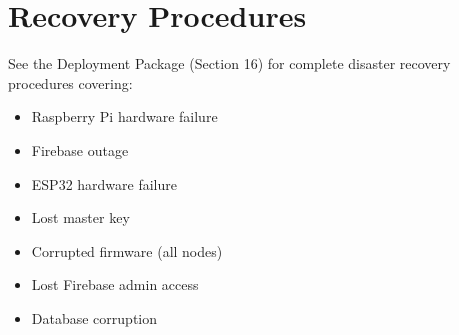 \section{Recovery Procedures}

See the Deployment Package (Section 16) for complete disaster recovery procedures covering:
\begin{itemize}[leftmargin=1.5em,noitemsep]
    \item Raspberry Pi hardware failure
    \item Firebase outage
    \item ESP32 hardware failure
    \item Lost master key
    \item Corrupted firmware (all nodes)
    \item Lost Firebase admin access
    \item Database corruption
\end{itemize}
